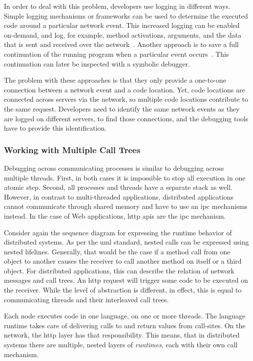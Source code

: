 In order to deal with this problem, developers use logging in
different ways. Simple logging mechanisms or frameworks can be used to
determine the executed code around a particular network event. This
increased logging can be enabled on-demand, and log, for example,
method activations, arguments, and the data that is sent and received
over the network~\cite{Artzi}. Another approach is to save a full
continuation of the running program when a particular event
occurs~\cite{ducasse2010dynamic}. This continuation can later be
inspected with a symbolic debugger.

The problem with these approaches is that they only provide a
one-to-one connection between a network event and a code
location. Yet, code locations are connected across servers via the
network, so multiple code locations contribute to the same
request. Developers need to identify the same network events as they
are logged on different servers, to find those connections, and the
debugging tools have to provide this identification.

\subsubsection{Working with Multiple Call Trees}
\label{sec:work-with-mult}

Debugging across communicating processes is similar to debugging
across multiple threads. First, in both cases it is impossible to stop
all execution in one atomic step. Second, all processes and threads
have a separate stack as well. However, in contrast to multi-threaded
applications, distributed applications cannot communicate through
shared memory and have to use an \ac{ipc} mechanisms instead. In the
case of Web applications, \ac{http} \acp{api} are the \ac{ipc}
mechanism.

Consider again the sequence diagram for expressing the runtime
behavior of distributed systems. As per the \ac{uml} standard, nested
calls can be expressed using nested lifelines. Generally, that would
be the case if a method call from one object to another causes the
receiver to call another method on itself or a third object. For
distributed applications, this can describe the relation of network
messages and call trees. An \ac{http} request will trigger some code
to be executed on the receiver. While the level of abstraction is
different, in effect, this is equal to communicating threads and their
interleaved call trees.

Each node executes code in one language, on one or more threads. The
language runtime takes care of delivering calls to and return values
from call-sites. On the network, the \ac{http} layer has that
responsibility. This means, that in distributed systems there are
multiple, nested layers of \emph{runtimes}, each with their own call
mechanism.

